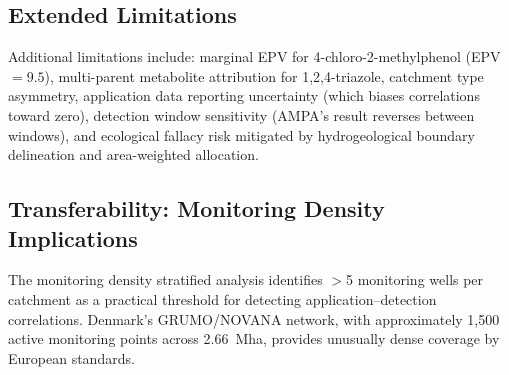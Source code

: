 \documentclass[12pt,a4paper]{article}
\begin{document}
\subsection{Extended Limitations}

Additional limitations include: marginal EPV for 4-chloro-2-methylphenol (EPV~$= 9.5$), multi-parent metabolite attribution for 1,2,4-triazole, catchment type asymmetry, application data reporting uncertainty (which biases correlations toward zero), detection window sensitivity (AMPA's result reverses between windows), and ecological fallacy risk mitigated by hydrogeological boundary delineation and area-weighted allocation.

\subsection{Transferability: Monitoring Density Implications}

The monitoring density stratified analysis identifies $>$5 monitoring wells per catchment as a practical threshold for detecting application--detection correlations. Denmark's GRUMO/\allowbreak{}NOVANA network, with approximately 1{,}500 active monitoring points across 2.66~Mha, provides unusually dense coverage by European standards.
\end{document}
